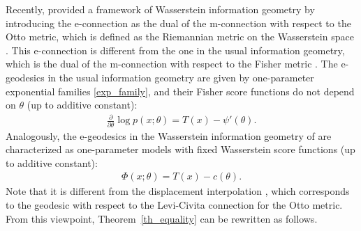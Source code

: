 \documentclass[11pt, a4paper]{article}
\begin{document}
Recently, \cite{ay2024information} provided a framework of Wasserstein information geometry by introducing the e-connection as the dual of the m-connection with respect to the Otto metric, which is defined as the Riemannian metric on the Wasserstein space \citep{Otto}.
This e-connection is different from the one in the usual information geometry, which is the dual of the m-connection with respect to the Fisher metric \cite{amari2000methods}.
The e-geodesics in the usual information geometry are given by one-parameter exponential families \eqref{exp_family}, and their Fisher score functions do not depend on $\theta$ (up to additive constant):
\begin{align*}
	\frac{\partial}{\partial \theta} \log p(x;\theta) = T(x)-\psi'(\theta).
\end{align*}
Analogously, the e-geodesics in the Wasserstein information geometry of \cite{ay2024information} are characterized as one-parameter models with fixed Wasserstein score functions (up to additive constant):
\begin{align*}
	\Phi(x; \theta) = T(x) - c(\theta).
\end{align*}
Note that it is different from the displacement interpolation \cite{villani2}, which corresponds to the geodesic with respect to the Levi-Civita connection for the Otto metric.
From this viewpoint, Theorem~\ref{th_equality} can be rewritten as follows.
\end{document}
